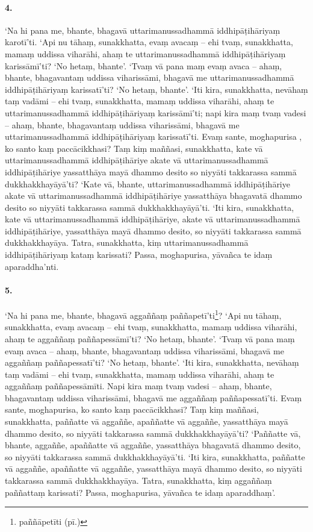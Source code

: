 \paragraph{4.} ‘Na hi pana me, bhante, bhagavā uttarimanussadhammā iddhipāṭihāriyaṃ karotī’ti. ‘Api nu tāhaṃ, sunakkhatta, evaṃ avacaṃ – ehi tvaṃ, sunakkhatta, mamaṃ uddissa viharāhi, ahaṃ te uttarimanussadhammā iddhipāṭihāriyaṃ karissāmī’ti? ‘No hetaṃ, bhante’. ‘Tvaṃ vā pana maṃ evaṃ avaca – ahaṃ, bhante, bhagavantaṃ uddissa viharissāmi, bhagavā me uttarimanussadhammā iddhipāṭihāriyaṃ karissatī’ti? ‘No hetaṃ, bhante’. ‘Iti kira, sunakkhatta, nevāhaṃ taṃ vadāmi – ehi tvaṃ, sunakkhatta, mamaṃ uddissa viharāhi, ahaṃ te uttarimanussadhammā iddhipāṭihāriyaṃ karissāmī’ti; napi kira maṃ tvaṃ vadesi – ahaṃ, bhante, bhagavantaṃ uddissa viharissāmi, bhagavā me uttarimanussadhammā iddhipāṭihāriyaṃ karissatī’ti. Evaṃ sante, moghapurisa , ko santo kaṃ paccācikkhasi? Taṃ kiṃ maññasi, sunakkhatta, kate vā uttarimanussadhammā iddhipāṭihāriye akate vā uttarimanussadhammā iddhipāṭihāriye yassatthāya mayā dhammo desito so niyyāti takkarassa sammā dukkhakkhayāyā’ti? ‘Kate vā, bhante, uttarimanussadhammā iddhipāṭihāriye akate vā uttarimanussadhammā iddhipāṭihāriye yassatthāya bhagavatā dhammo desito so niyyāti takkarassa sammā dukkhakkhayāyā’ti. ‘Iti kira, sunakkhatta, kate vā uttarimanussadhammā iddhipāṭihāriye, akate vā uttarimanussadhammā iddhipāṭihāriye, yassatthāya mayā dhammo desito, so niyyāti takkarassa sammā dukkhakkhayāya. Tatra, sunakkhatta, kiṃ uttarimanussadhammā iddhipāṭihāriyaṃ kataṃ karissati? Passa, moghapurisa, yāvañca te idaṃ aparaddha’nti.

\paragraph{5.} ‘Na hi pana me, bhante, bhagavā aggaññaṃ paññapetī’ti\footnote{paññāpetīti (pī.)}? ‘Api nu tāhaṃ, sunakkhatta, evaṃ avacaṃ – ehi tvaṃ, sunakkhatta, mamaṃ uddissa viharāhi, ahaṃ te aggaññaṃ paññapessāmī’ti? ‘No hetaṃ, bhante’. ‘Tvaṃ vā pana maṃ evaṃ avaca – ahaṃ, bhante, bhagavantaṃ uddissa viharissāmi, bhagavā me aggaññaṃ paññapessatī’ti? ‘No hetaṃ, bhante’. ‘Iti kira, sunakkhatta, nevāhaṃ taṃ vadāmi – ehi tvaṃ, sunakkhatta, mamaṃ uddissa viharāhi, ahaṃ te aggaññaṃ paññapessāmīti. Napi kira maṃ tvaṃ vadesi – ahaṃ, bhante, bhagavantaṃ uddissa viharissāmi, bhagavā me aggaññaṃ paññapessatī’ti. Evaṃ sante, moghapurisa, ko santo kaṃ paccācikkhasi? Taṃ kiṃ maññasi, sunakkhatta, paññatte vā aggaññe, apaññatte vā aggaññe, yassatthāya mayā dhammo desito, so niyyāti takkarassa sammā dukkhakkhayāyā’ti? ‘Paññatte vā, bhante, aggaññe, apaññatte vā aggaññe, yassatthāya bhagavatā dhammo desito, so niyyāti takkarassa sammā dukkhakkhayāyā’ti. ‘Iti kira, sunakkhatta, paññatte vā aggaññe, apaññatte vā aggaññe, yassatthāya mayā dhammo desito, so niyyāti takkarassa sammā dukkhakkhayāya. Tatra, sunakkhatta, kiṃ aggaññaṃ paññattaṃ karissati? Passa, moghapurisa, yāvañca te idaṃ aparaddhaṃ’.

